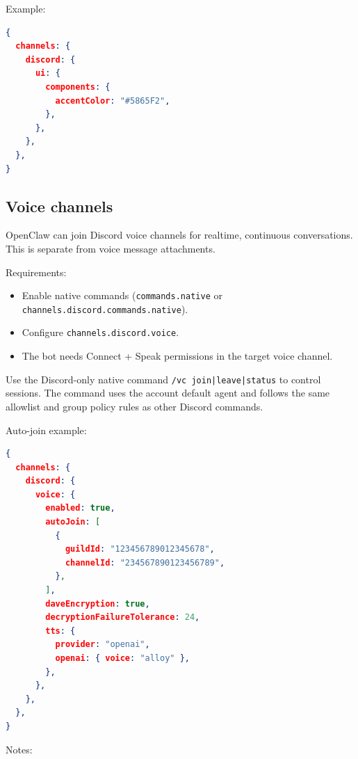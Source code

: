 Example:

\begin{lstlisting}[language=json]
{
  channels: {
    discord: {
      ui: {
        components: {
          accentColor: "#5865F2",
        },
      },
    },
  },
}
\end{lstlisting}


\subsection{Voice channels}


OpenClaw can join Discord voice channels for realtime, continuous conversations. This is separate from voice message attachments.

Requirements:

\begin{itemize}
  \item Enable native commands (\texttt{commands.native} or \texttt{channels.discord.commands.native}).
  \item Configure \texttt{channels.discord.voice}.
  \item The bot needs Connect + Speak permissions in the target voice channel.
\end{itemize}


Use the Discord-only native command \texttt{/vc join|leave|status} to control sessions. The command uses the account default agent and follows the same allowlist and group policy rules as other Discord commands.

Auto-join example:

\begin{lstlisting}[language=json]
{
  channels: {
    discord: {
      voice: {
        enabled: true,
        autoJoin: [
          {
            guildId: "123456789012345678",
            channelId: "234567890123456789",
          },
        ],
        daveEncryption: true,
        decryptionFailureTolerance: 24,
        tts: {
          provider: "openai",
          openai: { voice: "alloy" },
        },
      },
    },
  },
}
\end{lstlisting}


Notes:

